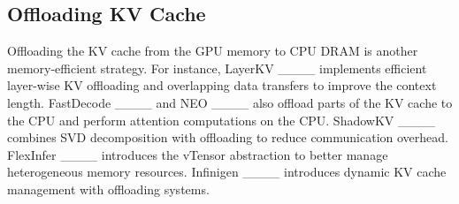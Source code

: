 \subsection{Offloading KV Cache}

Offloading the KV cache from the GPU memory to CPU DRAM is another memory-efficient strategy. For instance, LayerKV ____ implements efficient layer-wise KV offloading and overlapping data transfers to improve the context length. FastDecode ____ and NEO ____ also offload parts of the KV cache to the CPU and perform attention computations on the CPU. ShadowKV ____ combines SVD decomposition with offloading to reduce communication overhead. FlexInfer ____ introduces the vTensor abstraction to better manage heterogeneous memory resources. Infinigen ____ introduces dynamic KV cache management with offloading systems.

